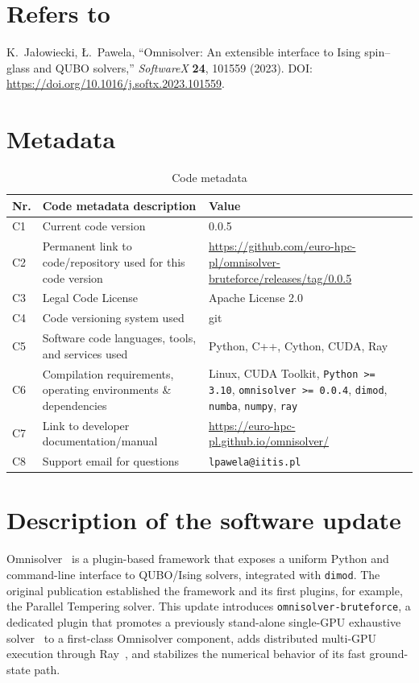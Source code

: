 \documentclass[preprint,12pt,a4paper]{elsarticle}
\begin{document}
\section*{Refers to}
K.~Ja\l{}owiecki, {\L}.~Pawela, ``Omnisolver: An extensible interface to Ising
spin--glass and QUBO solvers,'' \emph{SoftwareX} \textbf{24}, 101559 (2023).
DOI: \url{https://doi.org/10.1016/j.softx.2023.101559}.

\section*{Metadata}
\label{metadata}

\begin{table}[H]
\setlength{\tabcolsep}{4pt}
\begin{tabular}{|l|p{5.6cm}|p{6.4cm}|}
\hline
\textbf{Nr.} & \textbf{Code metadata description} & \textbf{Value} \\
\hline
C1 & Current code version & 0.0.5 \\
\hline
C2 & Permanent link to code/repository used for this code version &
\url{https://github.com/euro-hpc-pl/omnisolver-bruteforce/releases/tag/0.0.5} \\
\hline
C3 & Legal Code License & Apache License 2.0 \\
\hline
C4 & Code versioning system used & git \\
\hline
C5 & Software code languages, tools, and services used & Python, C++, Cython,
CUDA, Ray \\
\hline
C6 & Compilation requirements, operating environments \& dependencies & Linux,
CUDA Toolkit, \texttt{Python >= 3.10}, \texttt{omnisolver >= 0.0.4},
\texttt{dimod}, \texttt{numba}, \texttt{numpy}, \texttt{ray} \\
\hline
C7 & Link to developer documentation/manual &
\url{https://euro-hpc-pl.github.io/omnisolver/} \\
\hline
C8 & Support email for questions & \verb|lpawela@iitis.pl| \\
\hline
\end{tabular}
\caption{Code metadata}
\label{codeMetadata}
\end{table}

\linenumbers

\section{Description of the software update}
\label{sec:description}

Omnisolver~\cite{jalowiecki2021omnisolver} is a plugin-based framework that
exposes a uniform Python and command-line interface to QUBO/Ising solvers,
integrated with \texttt{dimod}. The original publication established the
framework and its first plugins, for example, the Parallel Tempering solver. This update introduces
\texttt{omnisolver-bruteforce}, a dedicated plugin that promotes a previously
stand-alone single-GPU exhaustive solver~\cite{jalowiecki2021brute} to a
first-class Omnisolver component, adds distributed multi-GPU execution
through Ray~\cite{DBLP:journals/corr/abs-1712-05889}, and stabilizes the
numerical behavior of its fast ground-state path.
\end{document}
